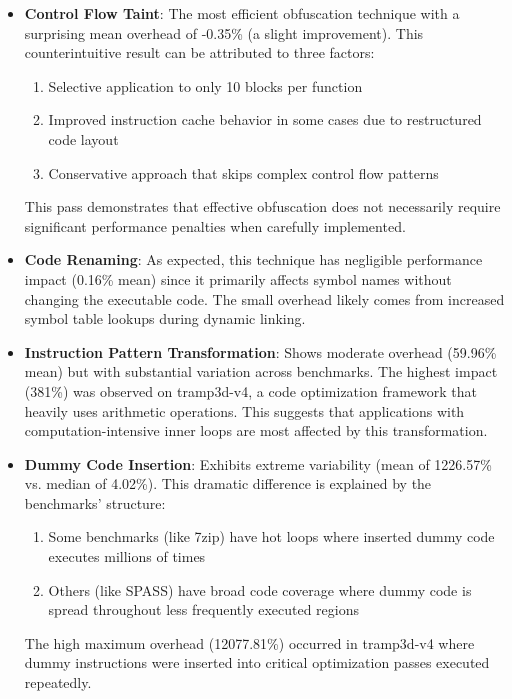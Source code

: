 \documentclass[conference]{IEEEtran}
\begin{document}
\begin{itemize}
    \item \textbf{Control Flow Taint}: The most efficient obfuscation technique with a surprising mean overhead of -0.35\% (a slight improvement). This counterintuitive result can be attributed to three factors:
    \begin{enumerate}
        \item Selective application to only 10 blocks per function
        \item Improved instruction cache behavior in some cases due to restructured code layout
        \item Conservative approach that skips complex control flow patterns
    \end{enumerate}
    This pass demonstrates that effective obfuscation does not necessarily require significant performance penalties when carefully implemented.
    
    \item \textbf{Code Renaming}: As expected, this technique has negligible performance impact (0.16\% mean) since it primarily affects symbol names without changing the executable code. The small overhead likely comes from increased symbol table lookups during dynamic linking.
    
    \item \textbf{Instruction Pattern Transformation}: Shows moderate overhead (59.96\% mean) but with substantial variation across benchmarks. The highest impact (381\%) was observed on tramp3d-v4, a code optimization framework that heavily uses arithmetic operations. This suggests that applications with computation-intensive inner loops are most affected by this transformation.
    
    \item \textbf{Dummy Code Insertion}: Exhibits extreme variability (mean of 1226.57\% vs. median of 4.02\%). This dramatic difference is explained by the benchmarks' structure:
    \begin{enumerate}
        \item Some benchmarks (like 7zip) have hot loops where inserted dummy code executes millions of times
        \item Others (like SPASS) have broad code coverage where dummy code is spread throughout less frequently executed regions
    \end{enumerate}
    The high maximum overhead (12077.81\%) occurred in tramp3d-v4 where dummy instructions were inserted into critical optimization passes executed repeatedly.
\end{itemize}
\end{document}
